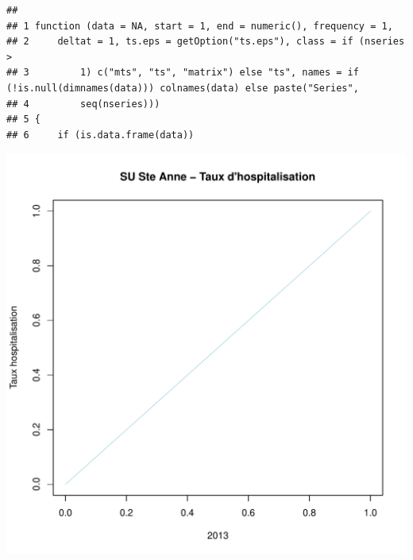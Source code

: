 \documentclass[12pt,english,french,twoside]{report}\usepackage[]{graphicx}\usepackage[]{color}
\makeatletter
\def\maxwidth{ %
  \ifdim\Gin@nat@width>\linewidth
    \linewidth
  \else
    \Gin@nat@width
  \fi
}
\newenvironment{kframe}{%
 \def\at@end@of@kframe{}%
 \ifinner\ifhmode%
  \def\at@end@of@kframe{\end{minipage}}%
  \begin{minipage}{\columnwidth}%
 \fi\fi%
 \def\FrameCommand##1{\hskip\@totalleftmargin \hskip-\fboxsep
 \colorbox{shadecolor}{##1}\hskip-\fboxsep
     \hskip-\linewidth \hskip-\@totalleftmargin \hskip\columnwidth}%
 \MakeFramed {\advance\hsize-\width
   \@totalleftmargin\z@ \linewidth\hsize
   \@setminipage}}%
 {\par\unskip\endMakeFramed%
 \at@end@of@kframe}
\newenvironment{knitrout}{}{} %
\makeatother
\begin{document}
\begin{knitrout}
\color{fgcolor}\begin{kframe}


{\ttfamily\noindent\bfseries\color{errorcolor}{\#\# Error: objet de type 'closure' non indiçable}}\begin{verbatim}
##                                                                                                                            
## 1 function (data = NA, start = 1, end = numeric(), frequency = 1,                                                          
## 2     deltat = 1, ts.eps = getOption("ts.eps"), class = if (nseries >                                                      
## 3         1) c("mts", "ts", "matrix") else "ts", names = if (!is.null(dimnames(data))) colnames(data) else paste("Series", 
## 4         seq(nseries)))                                                                                                   
## 5 {                                                                                                                        
## 6     if (is.data.frame(data))
\end{verbatim}
\end{kframe}
\includegraphics[width=\maxwidth]{figure/hospit_stAnne} 
\begin{kframe}

{\ttfamily\noindent\bfseries{}}\end{kframe}
\end{knitrout}
\end{document}
